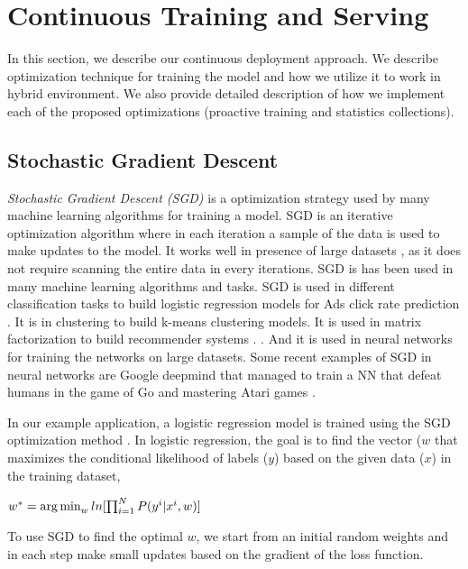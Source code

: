 \section{Continuous Training and Serving} \label{continious-training-serving}
In this section, we describe our continuous deployment approach.
We describe optimization technique for training the model and how we utilize it to work in hybrid environment.
We also provide detailed description of how we implement each of the proposed optimizations (proactive training and statistics collections).

\subsection{Stochastic Gradient Descent} \label{sgd}
\textit{Stochastic Gradient Descent (SGD) } is a optimization strategy used by many machine learning algorithms for training a model.
SGD is an iterative optimization algorithm where in each iteration a sample of the data is used to make updates to the model.
It works well in presence of large datasets \cite{bottou2010large}, as it does not require scanning the entire data in every iterations.
SGD is has been used in many machine learning algorithms and tasks.
SGD is used in different classification \cite{zhang2004solving} tasks to build logistic regression models for Ads click rate prediction \cite{macmahan2013}.
It is in clustering \cite{bottou1995convergence} to build k-means clustering models.
It is used in matrix factorization \cite{funk2006netflix} to build recommender systems  \cite{koren2009matrix}. .
And it is used in neural networks \cite{dean2012large} for training the networks on large datasets.
Some recent examples of SGD in neural networks are Google deepmind that managed to train a NN that defeat humans in the game of Go  \cite{silver2016mastering} and mastering Atari games \cite{mnih2013playing} .

In our example application, a logistic regression model is trained using the SGD optimization method \cite{macmahan2013}.
In logistic regression, the goal is to find the vector ($w$ that maximizes the conditional likelihood of labels ($y$) based on the given data ($x$) in the training dataset,

$w^* = \operatorname*{arg\,min}_w ln[\prod_{i=1}^{N} P(y^i | x^i, w)]$

To use SGD to find the optimal $w$, we start from an initial random weights and in each step make small updates based on the gradient of the loss function. 

